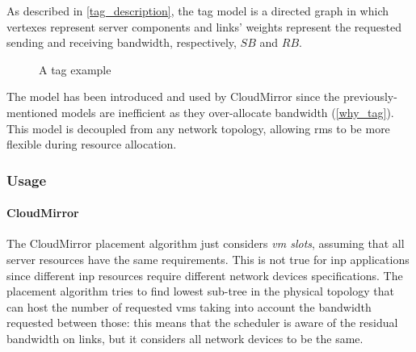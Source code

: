 
As described in \autoref{tag_description}, the \gls{tag} model is a directed graph in which vertexes represent server components and links' weights represent the requested sending and receiving bandwidth, respectively, $SB$ and $RB$.

\begin{figure}[!htb]
    \centering
    \usebox{\tagfigure}
    \caption{A \gls{tag} example}
\end{figure}

The model has been introduced and used by CloudMirror \cite{cloudmirror} since the previously-mentioned models are inefficient as they over-allocate bandwidth (\autoref{why_tag}).
This model is decoupled from any network topology, allowing \glspl{rm} to be more flexible during resource allocation.

\subsubsection{Usage}
\paragraph{CloudMirror \texorpdfstring{\cite{cloudmirror}}{}}
The CloudMirror \cite{cloudmirror} placement algorithm just considers \textit{\gls{vm} slots}, assuming that all server resources have the same requirements.
This is not true for \gls{inp} applications since different \gls{inp} resources require different network devices specifications.
The placement algorithm tries to find lowest sub-tree in the physical topology that can host the number of requested \glspl{vm} taking into account the bandwidth requested between those: this means that the scheduler is aware of the residual bandwidth on links, but it considers all network devices to be the same.
